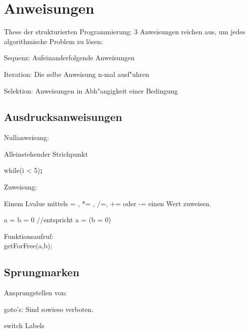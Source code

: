 \section{Anweisungen}
  These der strukturierten Programmierung: 3 Anweisungen reichen aus, um jedes algorithmische Problem zu lösen:
  	\begin{compactitem}
  		\item Sequenz: Aufeinanderfolgende Anweisungen
  		\item Iteration: Die selbe Anweisung n-mal ausf"uhren
  		\item Selektion: Anweisungen in Abh"angigkeit einer Bedingung
  	\end{compactitem}
  \subsection{Ausdrucksanweisungen}
    \begin{minipage}[c]{6 cm}
    Nullanweisung:
    
    Alleinstehender Strichpunkt
    	
    while(i < 5)\textbf{;}
    
    \end{minipage}
    \hspace*{0.5cm}
    \begin{minipage}[c]{6 cm}
    	Zuweisung:	
    	
    	Einem Lvalue mittels = , *= , /=, += oder -= einen Wert zuweisen.
    	
    	a = b = 0 //entspricht a = (b = 0)
    \end{minipage}	
   	\hspace*{0.5cm}
    \begin{minipage}[c]{5 cm}
		Funktionsaufruf: \\
		getForFree(a,b);
    \end{minipage}
    
   \subsection{Sprungmarken}
     Ansprungstellen von: \\
          \begin{minipage}[c]{6 cm}
          \begin{compactitem}
           \item goto's: Sind sowieso verboten.
          \end{compactitem}

          \end{minipage}	
         	\hspace*{0.5cm}
          \begin{minipage}[c]{5 cm}
          \begin{compactitem}
           \item switch Labels
          \end{compactitem}
          \end{minipage}
